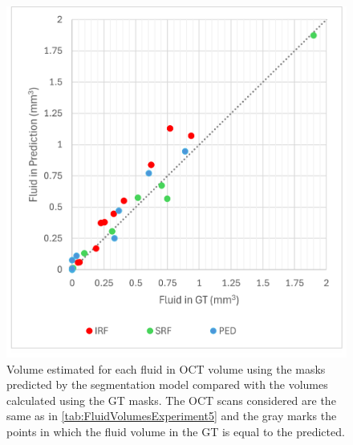 \begin{figure}[!ht]
	\centering	\includegraphics[width=0.75\linewidth]{figures/FluidVolumeScatterExperiment5.png}
	\caption{Volume estimated for each fluid in OCT volume using the masks predicted by the segmentation model compared with the volumes calculated using the GT masks. The OCT scans considered are the same as in \ref{tab:FluidVolumesExperiment5} and the gray marks the points in which the fluid volume in the GT is equal to the predicted.}
	\label{fig:FluidVolumeScatterExperiment5}
\end{figure}

